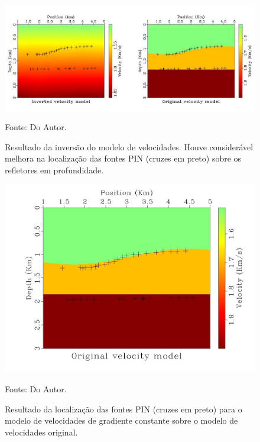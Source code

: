 \begin{figure}[H]
\caption{Resultado da inversão do modelo de velocidades. Houve considerável melhora na
localização das fontes PIN (cruzes em preto) sobre os refletores em profundidade.}
\begin{center}
\includegraphics[scale=2]{images/inverted-original.jpeg}
\vspace{-0.3cm}
\end{center}
\begin{center}
 Fonte: Do Autor.
\end{center}
\label{fig:11.2}
\end{figure}

\begin{figure}[H]
\caption{Resultado da localização das fontes PIN (cruzes em preto)
para o modelo de velocidades de gradiente constante sobre o modelo de velocidades original.}
\begin{center}
\includegraphics[scale=0.25]{images/gzvel.jpeg}
\vspace{-0.3cm}
\end{center}
\begin{center}
 Fonte: Do Autor.
\end{center}
\label{fig:11.3}
\end{figure}

